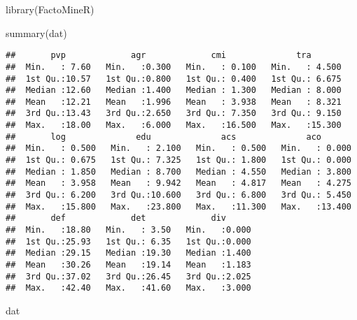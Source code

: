 \documentclass[
]{article}
\newenvironment{Shaded}{\begin{snugshade}}{\end{snugshade}}
\newcommand{\FunctionTok}[1]{\textcolor[rgb]{0.00,0.00,0.00}{#1}}
\newcommand{\NormalTok}[1]{#1}
\begin{document}
\begin{Shaded}
\begin{Highlighting}[]
\FunctionTok{library}\NormalTok{(FactoMineR)}


\FunctionTok{summary}\NormalTok{(dat)}
\end{Highlighting}
\end{Shaded}

\begin{verbatim}
##       pvp             agr             cmi              tra        
##  Min.   : 7.60   Min.   :0.300   Min.   : 0.100   Min.   : 4.500  
##  1st Qu.:10.57   1st Qu.:0.800   1st Qu.: 0.400   1st Qu.: 6.675  
##  Median :12.60   Median :1.400   Median : 1.300   Median : 8.000  
##  Mean   :12.21   Mean   :1.996   Mean   : 3.938   Mean   : 8.321  
##  3rd Qu.:13.43   3rd Qu.:2.650   3rd Qu.: 7.350   3rd Qu.: 9.150  
##  Max.   :18.00   Max.   :6.000   Max.   :16.500   Max.   :15.300  
##       log              edu              acs              aco        
##  Min.   : 0.500   Min.   : 2.100   Min.   : 0.500   Min.   : 0.000  
##  1st Qu.: 0.675   1st Qu.: 7.325   1st Qu.: 1.800   1st Qu.: 0.000  
##  Median : 1.850   Median : 8.700   Median : 4.550   Median : 3.800  
##  Mean   : 3.958   Mean   : 9.942   Mean   : 4.817   Mean   : 4.275  
##  3rd Qu.: 6.200   3rd Qu.:10.600   3rd Qu.: 6.800   3rd Qu.: 5.450  
##  Max.   :15.800   Max.   :23.800   Max.   :11.300   Max.   :13.400  
##       def             det             div       
##  Min.   :18.80   Min.   : 3.50   Min.   :0.000  
##  1st Qu.:25.93   1st Qu.: 6.35   1st Qu.:0.000  
##  Median :29.15   Median :19.30   Median :1.400  
##  Mean   :30.26   Mean   :19.14   Mean   :1.183  
##  3rd Qu.:37.02   3rd Qu.:26.45   3rd Qu.:2.025  
##  Max.   :42.40   Max.   :41.60   Max.   :3.000
\end{verbatim}

\begin{Shaded}
\begin{Highlighting}[]
\NormalTok{dat}
\end{Highlighting}
\end{Shaded}
\end{document}
